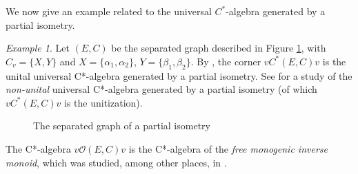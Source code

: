 \documentclass[11pt]{amsart}
\theoremstyle{plain}            %
\theoremstyle{definition}       %
\theoremstyle{definition}       %
\theoremstyle{remark}
\newtheorem{example}[theorem]{Example}
\begin{document}
We now give an example related to the universal $C^*$-algebra generated by a partial isometry.


\begin{example}
	\label{exam:alggenepi} Let $(E,C)$ be the separated graph described
	in Figure \ref{fig:partiisometry}, with $C_v=\{ X, Y\}$ and $X=\{
	\alpha _1,\alpha_2\}$, $Y=\{ \beta _1,\beta _2 \}$. By
	\cite[Lemma 5.5(a)]{Aone-rel}, the corner $vC^*(E,C)v$ is the unital
	universal C*-algebra generated by a partial isometry. See \cite{BN}
	for a study of the {\it non-unital} universal C*-algebra
	generated by a partial isometry (of which $vC^*(E,C)v$ is the
	unitization).
	
	
	
	\begin{center}{
			\begin{figure}[htb]
				\caption{The separated graph of a partial isometry}
				\label{fig:partiisometry}
		\end{figure}}
	\end{center}
	
	
	The C*-algebra $v\mathcal O (E,C) v$ is the C*-algebra of the {\it
		free monogenic inverse monoid}, which was studied, among other
	places, in \cite{HR}. 
\end{example}
\end{document}
